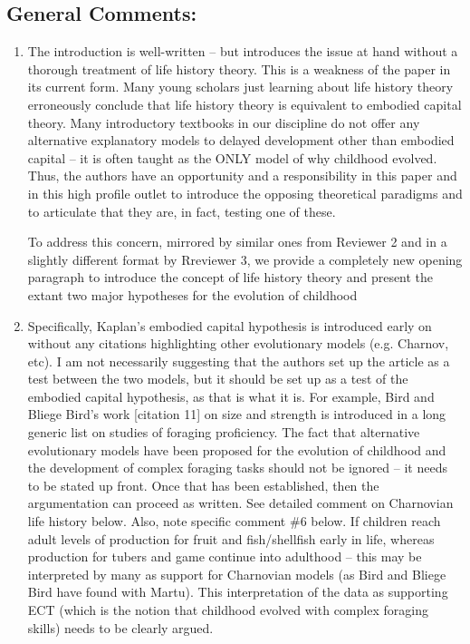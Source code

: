 \documentclass{article}
\newcommand{\rev}[1]{{\color{ForestGreen}#1}}
\begin{document}
\subsection{General Comments:}
\begin{enumerate}
    \item The introduction is well-written – but introduces the issue at hand without a thorough treatment of life history theory. This is a weakness of the paper in its current form. Many young scholars just learning about life history theory erroneously conclude that life history theory is equivalent to embodied capital theory. Many introductory textbooks in our discipline do not offer any alternative explanatory models to delayed development other than embodied capital – it is often taught as the ONLY model of why childhood evolved. Thus, the authors have an opportunity and a responsibility in this paper and in this high profile outlet to introduce the opposing theoretical paradigms and to articulate that they are, in fact, testing one of these.

\rev{To address this concern, mirrored by similar ones from Reviewer 2 and in a slightly different format by Rreviewer 3, we provide a completely new opening paragraph to introduce the concept of life history theory and present the extant two major hypotheses for the evolution of childhood}

    \item Specifically, Kaplan’s embodied capital hypothesis is introduced early on without any citations highlighting other evolutionary models (e.g. Charnov, etc). I am not necessarily suggesting that the authors set up the article as a test between the two models, but it should be set up as a test of the embodied capital hypothesis, as that is what it is. For example, Bird and Bliege Bird’s work [citation 11] on size and strength is introduced in a long generic list on studies of foraging proficiency. The fact that alternative evolutionary models have been proposed for the evolution of childhood and the development of complex foraging tasks should not be ignored – it needs to be stated up front. Once that has been established, then the argumentation can proceed as written. See detailed comment on Charnovian life history below. Also, note specific comment \#6 below. If children reach adult levels of production for fruit and fish/shellfish early in life, whereas production for tubers and game continue into adulthood – this may be interpreted by many as support for Charnovian models (as Bird and Bliege Bird have found with Martu). This interpretation of the data as supporting ECT (which is the notion that childhood evolved with complex foraging skills) needs to be clearly argued.


\end{enumerate}
\end{document}
